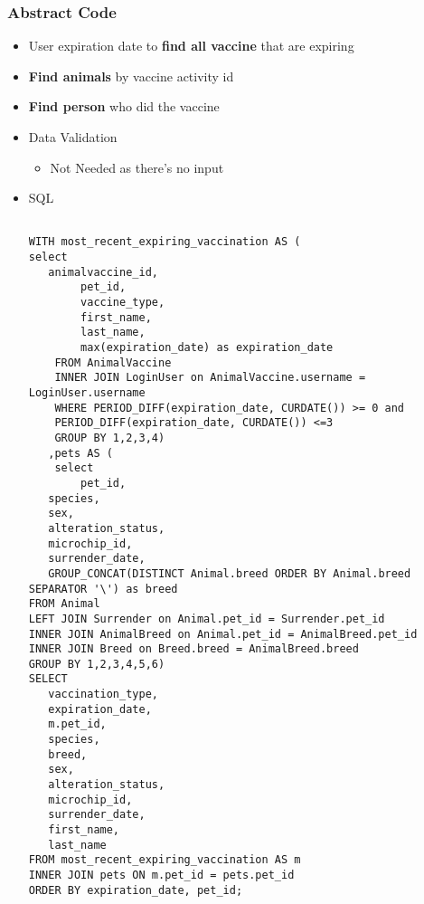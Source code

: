 \documentclass[a4paper]{article}
\begin{document}
\subsubsection*{Abstract Code}

\begin{itemize}
	\item User expiration date to \textbf{find all vaccine} that are expiring
    \item \textbf{Find animals} by vaccine activity id
    \item \textbf{Find person} who did the vaccine
    \item Data Validation
    \begin{itemize}

        \item Not Needed as there's no input

    \end{itemize}
\item SQL
\begin{verbatim}

WITH most_recent_expiring_vaccination AS (
select
   animalvaccine_id,
        pet_id,
        vaccine_type,
        first_name,
        last_name,
        max(expiration_date) as expiration_date
    FROM AnimalVaccine
    INNER JOIN LoginUser on AnimalVaccine.username = LoginUser.username
    WHERE PERIOD_DIFF(expiration_date, CURDATE()) >= 0 and
    PERIOD_DIFF(expiration_date, CURDATE()) <=3
    GROUP BY 1,2,3,4)
   ,pets AS (
    select
        pet_id,
   species,
   sex,
   alteration_status,
   microchip_id,
   surrender_date,
   GROUP_CONCAT(DISTINCT Animal.breed ORDER BY Animal.breed SEPARATOR '\') as breed
FROM Animal
LEFT JOIN Surrender on Animal.pet_id = Surrender.pet_id
INNER JOIN AnimalBreed on Animal.pet_id = AnimalBreed.pet_id
INNER JOIN Breed on Breed.breed = AnimalBreed.breed
GROUP BY 1,2,3,4,5,6)
SELECT
   vaccination_type,
   expiration_date,
   m.pet_id,
   species,
   breed,
   sex,
   alteration_status,
   microchip_id,
   surrender_date,
   first_name,
   last_name
FROM most_recent_expiring_vaccination AS m
INNER JOIN pets ON m.pet_id = pets.pet_id
ORDER BY expiration_date, pet_id;


\end{verbatim}

\end{itemize}
\end{document}
